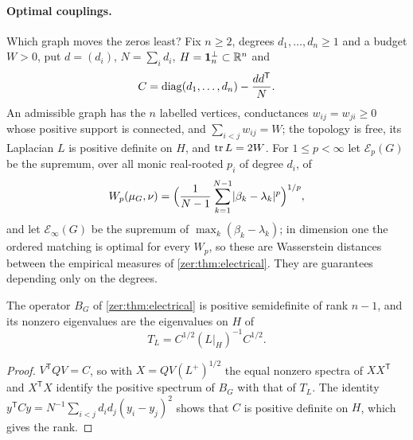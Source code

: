 \paragraph{Optimal couplings.}
Which graph moves the zeros least? Fix $n\ge2$, degrees $d_1,\dots,d_n\ge1$ and a budget $W>0$,
put $d=(d_i)$, $N=\sum_id_i$, $H=\mathbf 1_n^\perp\subset\mathbb{R}^n$ and
\begin{equation}\label{zer:eq:Cdeg}
 C=\operatorname{diag}(d_1,\dots,d_n)-\frac{dd^{\mathsf T}}N .
\end{equation}
An admissible graph has the $n$ labelled vertices, conductances $w_{ij}=w_{ji}\ge0$ whose positive
support is connected, and $\sum_{i<j}w_{ij}=W$; the topology is free, its Laplacian $L$ is positive
definite on $H$, and $\operatorname{tr} L=2W$. For $1\le p<\infty$ let $\mathcal E_p(G)$ be the supremum, over all
monic real-rooted $p_i$ of degree $d_i$, of
\[
 W_p(\mu_G,\nu)=\Bigl(\frac1{N-1}\sum_{k=1}^{N-1}\lvert\beta_k-\lambda_k\rvert^p\Bigr)^{1/p},
\]
and let $\mathcal E_\infty(G)$ be the supremum of $\max_k(\beta_k-\lambda_k)$; in dimension one the
ordered matching is optimal for every $W_p$, so these are Wasserstein distances between the
empirical measures of \cref{zer:thm:electrical}. They are guarantees depending only on the degrees.

\begin{lemma}\label{zer:lem:reducedB}
The operator $B_G$ of \cref{zer:thm:electrical} is positive semidefinite of rank $n-1$, and its
nonzero eigenvalues are the eigenvalues on $H$ of
\[
 T_L=C^{1/2}(L|_H)^{-1}C^{1/2}.
\]
\end{lemma}
\begin{proof}
$V^{\mathsf T}QV=C$, so with $X=QV(L^+)^{1/2}$ the equal nonzero spectra of $XX^{\mathsf T}$ and
$X^{\mathsf T}X$ identify the positive spectrum of $B_G$ with that of $T_L$. The identity
$y^{\mathsf T}Cy=N^{-1}\sum_{i<j}d_id_j(y_i-y_j)^2$ shows that $C$ is positive definite on $H$, which
gives the rank.
\end{proof}

